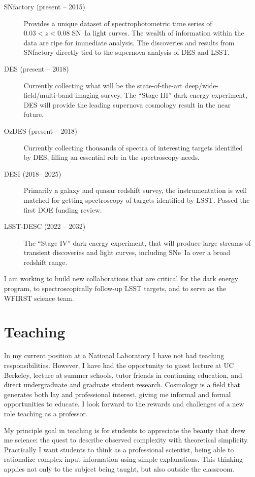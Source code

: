 \documentclass{article}
\begin{document}
\begin{description}
\item[SNfactory (present -- 2015)]  Provides a unique dataset of
spectrophotometric time series of $0.03<z<0.08$ SN~Ia light curves.  The wealth of information
within the data are ripe for immediate analysis. The discoveries and results from SNfactory directly tied to the supernova
analysis of DES and LSST.
\item[DES (present -- 2018)] Currently collecting what will be the state-of-the-art deep/wide-field/multi-band
imaging survey.   The ``Stage III'' dark energy experiment, DES will provide the leading supernova
cosmology result in the near future.
\item[OzDES (present -- 2018)] Currently collecting thousands of spectra of interesting targets identified by DES,
filling an essential role in the spectroscopy needs.
\item[DESI (2018-- 2025)]  Primarily a galaxy and quasar redshift survey, the instrumentation is well matched for
getting spectroscopy of targets identified by LSST. Passed the first DOE funding review.
\item[LSST-DESC (2022 -- 2032)]  The ``Stage IV'' dark energy experiment, that will produce large streams of
transient discoveries and light curves, including SNe~Ia over a broad redshift range.
\end{description}

I am working to build new collaborations that are critical for the dark energy program, 
to
spectroscopically follow-up LSST targets, and to serve as the WFIRST science team.

\section{Teaching}
In my current position at a National Laboratory I have not had teaching responsibilities.  However,
I have had the opportunity to guest lecture at UC Berkeley, lecture at summer schools, tutor friends
in continuing education, and direct undergraduate and graduate student research.  Cosmology
is a field that generates both lay and professional interest, giving me informal and formal opportunities to
educate.  I look forward to the rewards and challenges of a new role teaching as a professor. 

My principle goal in teaching is for students to appreciate the beauty that drew me science: the quest to
describe  observed complexity with
theoretical simplicity.  Practically I want students to think as a professional scientist, being able to 
rationalize complex input information using simple explanations.
This thinking applies not only to the subject being taught,  but also
outside the classroom.
\end{document}
